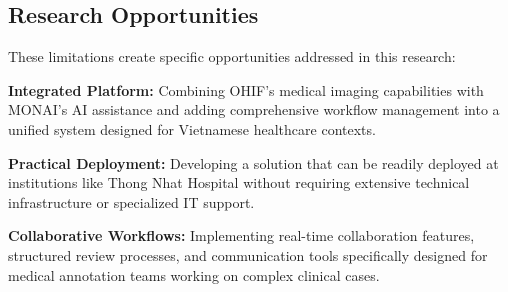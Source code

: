 \subsection{Research Opportunities}

These limitations create specific opportunities addressed in this research:

\textbf{Integrated Platform:} Combining OHIF's medical imaging capabilities with MONAI's AI assistance and adding comprehensive workflow management into a unified system designed for Vietnamese healthcare contexts.

\textbf{Practical Deployment:} Developing a solution that can be readily deployed at institutions like Thong Nhat Hospital without requiring extensive technical infrastructure or specialized IT support.

\textbf{Collaborative Workflows:} Implementing real-time collaboration features, structured review processes, and communication tools specifically designed for medical annotation teams working on complex clinical cases. 